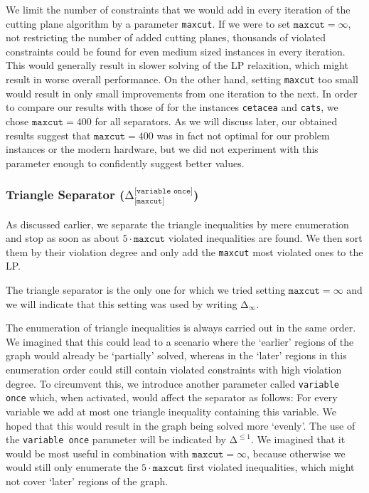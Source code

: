 We limit the number of constraints that we would add in every iteration of the cutting plane algorithm by a parameter \texttt{maxcut}.
If we were to set $\texttt{maxcut} = \infty$, \ie not restricting the number of added cutting planes, thousands of violated constraints could be found for even medium sized instances in every iteration.
This would generally result in slower solving of the LP relaxition, which might result in worse overall performance.
On the other hand, setting \texttt{maxcut} too small would result in only small improvements from one iteration to the next.
In order to compare our results with those of \cite{grotschelCuttingPlaneAlgorithm1989} for the instances \texttt{cetacea} and \texttt{cats}, we chose $\texttt{maxcut} = 400$ for all separators.
As we will discuss later, our obtained results suggest that $\texttt{maxcut} = 400$ was in fact not optimal for our problem instances or the modern hardware,
but we did not experiment with this parameter enough to confidently suggest better values.

\subsubsection{Triangle Separator (\texorpdfstring{$\texttt{Δ}_{\texttt{[maxcut]}}^{\texttt{[variable once]}}$}{Δ})}
As discussed earlier, we separate the triangle inequalities by mere enumeration and stop as soon as about $5\cdot\texttt{maxcut}$ violated inequalities are found.
We then sort them by their violation degree and only add the \texttt{maxcut} most violated ones to the LP.

The triangle separator is the only one for which we tried setting $\texttt{maxcut} = \infty$ and we will indicate that this setting was used by writing $\texttt{Δ}_{\infty}$.

The enumeration of triangle inequalities is always carried out in the same order.
We imagined that this could lead to a scenario where the ‘earlier’ regions of the graph would already be ‘partially’ solved, whereas in the ‘later’ regions in this enumeration order could still contain violated constraints with high violation degree.
To circumvent this, we introduce another parameter called \texttt{variable once} which, when activated, would affect the separator as follows:
For every variable we add at most one triangle inequality containing this variable.
We hoped that this would result in the graph being solved more ‘evenly’.
The use of the \texttt{variable once} parameter will be indicated by $\texttt{Δ}^{\leq 1}$.
We imagined that it would be most useful in combination with $\texttt{maxcut} = \infty$, because otherwise we would still only enumerate the $5 \cdot \texttt{maxcut}$ first violated inequalities, which might not cover ‘later’ regions of the graph.

